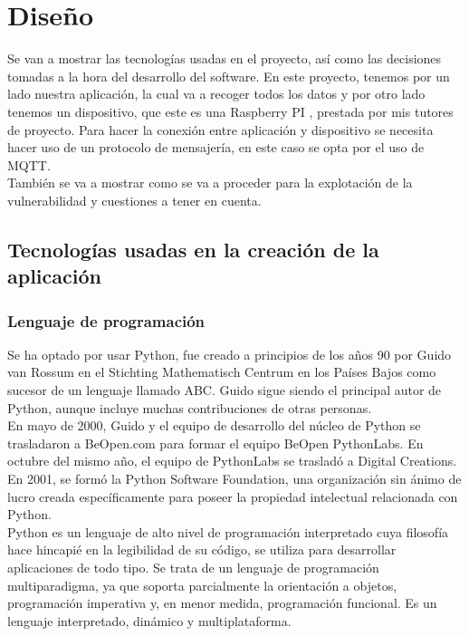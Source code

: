 \chapter{Diseño}

{\color{blue}


Se van a mostrar las tecnologías usadas en el proyecto, así como las decisiones tomadas a la hora del desarrollo del software. En este proyecto, tenemos por un lado nuestra aplicación, la cual va a recoger todos los datos y por otro lado tenemos un dispositivo, que este es una Raspberry PI \cite{raspberry-specs}, prestada por mis tutores de proyecto. Para hacer la conexión entre aplicación y dispositivo se necesita hacer uso de un protocolo de mensajería, en este caso se opta por el uso de MQTT. \\

También se va a mostrar como se va a proceder para la explotación de la vulnerabilidad y cuestiones a tener en cuenta.

\section{Tecnologías usadas en la creación de la aplicación}

\subsection{Lenguaje de programación}

Se ha optado por usar Python, fue creado a principios de los años 90 por Guido van Rossum en el Stichting Mathematisch Centrum en los Países Bajos como sucesor de un lenguaje llamado ABC. Guido sigue siendo el principal autor de Python, aunque incluye muchas contribuciones de otras personas. \\

En mayo de 2000, Guido y el equipo de desarrollo del núcleo de Python se trasladaron a BeOpen.com para formar el equipo BeOpen PythonLabs. En octubre del mismo año, el equipo de PythonLabs se trasladó a Digital Creations. En 2001, se formó la Python Software Foundation, una organización sin ánimo de lucro creada específicamente para poseer la propiedad intelectual relacionada con Python. \cite{python-history} \\

Python es un lenguaje de alto nivel de programación interpretado cuya filosofía hace hincapié en la legibilidad de su código, se utiliza para desarrollar aplicaciones de todo tipo. Se trata de un lenguaje de programación multiparadigma, ya que soporta parcialmente la orientación a objetos, programación imperativa y, en menor medida, programación funcional. Es un lenguaje interpretado, dinámico y multiplataforma. \cite{python-wiki} \\

}
